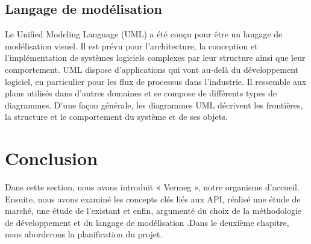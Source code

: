 \subsection{Langage de modélisation}

Le Unified Modeling Language (UML) a été conçu pour être un langage de modélisation visuel. Il est prévu pour l'architecture, la conception et l'implémentation de systèmes logiciels complexes par leur structure ainsi que leur  comportement. UML dispose d'applications qui vont au-delà du développement logiciel, en particulier pour les flux de processus dans l'industrie. Il ressemble aux plans utilisés dans d'autres domaines et se compose de différents types de diagrammes. D'une façon générale, les diagrammes UML décrivent les frontières, la structure et le comportement du système et de ses objets. \cite[]{UML}

\section*{Conclusion}

Dans cette section, nous avons introduit « Vermeg », notre organisme d’accueil. Ensuite, nous avons examiné les concepts clés liés aux API, réalisé une étude de marché, une étude de l’existant et enfin, argumenté du choix de la méthodologie de développement et du langage de modélisation .Dans le deuxième chapitre, nous aborderons la planification du projet. 


